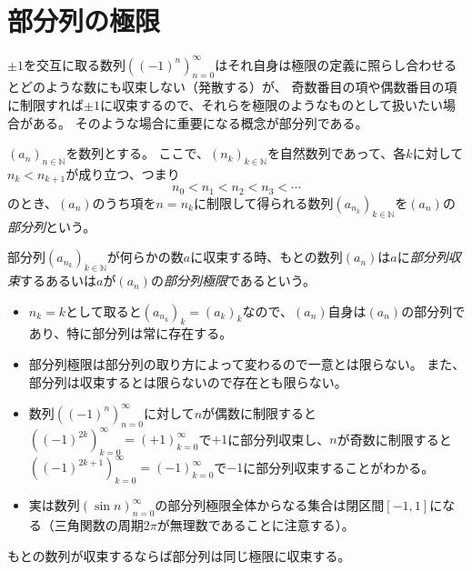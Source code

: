 \section{部分列の極限}

$\pm 1$を交互に取る数列$((-1)^n)_{n = 0}^\infty$はそれ自身は極限の定義に照らし合わせるとどのような数にも収束しない（発散する）が、
奇数番目の項や偶数番目の項に制限すれば$\pm 1$に収束するので、それらを極限のようなものとして扱いたい場合がある。
そのような場合に重要になる概念が部分列である。

\begin{definition}[部分列]
$(a_n)_{n \in \mathbb{N}}$を数列とする。
ここで、$(n_k)_{k \in \mathbb{N}}$を自然数列であって、各$k$に対して$n_k < n_{k+1}$が成り立つ、つまり
$$
n_0 < n_1 < n_2 < n_3 < \cdots
$$
のとき、$(a_n)$のうち項を$n = n_k$に制限して得られる数列$(a_{n_k})_{k \in \mathbb{N}}$を$(a_n)$の\emph{部分列}という。

部分列$(a_{n_k})_{k \in \mathbb{N}}$が何らかの数$a$に収束する時、もとの数列$(a_n)$は$a$に\emph{部分列収束}するあるいは$a$が$(a_n)$の\emph{部分列極限}であるという。
\end{definition}

\begin{remark}
\begin{itemize}
\item
$n_k = k$として取ると$(a_{n_k})_k = (a_k)_k$なので、$(a_n)$自身は$(a_n)$の部分列であり、特に部分列は常に存在する。
\item
部分列極限は部分列の取り方によって変わるので一意とは限らない。
また、部分列は収束するとは限らないので存在とも限らない。
\end{itemize}
\end{remark}

\begin{example}
\begin{itemize}
\item
数列$((-1)^n)_{n = 0}^\infty$に対して$n$が偶数に制限すると$((-1)^{2 k})_{k = 0}^\infty = (+1)_{k = 0}^\infty$で$+1$に部分列収束し、$n$が奇数に制限すると$((-1)^{2 k+1})_{k = 0}^\infty = (-1)_{k = 0}^\infty$で$-1$に部分列収束することがわかる。
\item
実は数列$(\sin n)_{n = 0}^\infty$の部分列極限全体からなる集合は閉区間$[-1, 1]$になる（三角関数の周期$2\pi$が無理数であることに注意する）。
\end{itemize}
\end{example}

もとの数列が収束するならば部分列は同じ極限に収束する。

